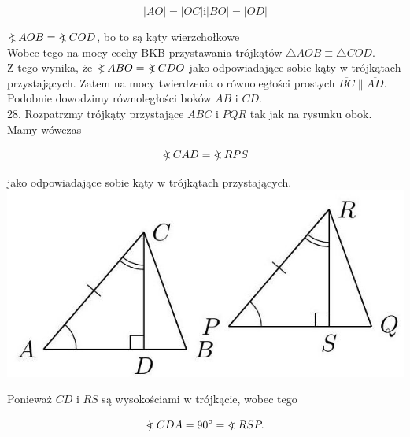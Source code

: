 \documentclass[10pt]{article}
\newcommand\Varangle{\mathop{{<\!\!\!\!\!\text{\small)}}\:}\nolimits}
\begin{document}
\[
|A O|=|O C| \mathrm{i}|B O|=|O D|
\]

\(\Varangle A O B=\Varangle C O D\), bo to są kąty wierzchołkowe\\
Wobec tego na mocy cechy BKB przystawania trójkątów \(\triangle A O B \equiv \triangle C O D\).\\
Z tego wynika, że \(\Varangle A B O=\Varangle C D O\) jako odpowiadające sobie kąty w trójkątach przystających. Zatem na mocy twierdzenia o równoległości prostych \(\overline{B C} \| \overline{A D}\). Podobnie dowodzimy równoległości boków \(A B\) i \(C D\).\\
28. Rozpatrzmy trójkąty przystające \(A B C\) i \(P Q R\) tak jak na rysunku obok. Mamy wówczas

\[
\Varangle C A D=\Varangle R P S
\]

jako odpowiadające sobie kąty w trójkątach przystających.\\
\includegraphics[max width=\textwidth, center]{2024_11_21_71f62bd117d375398909g-067}

Ponieważ \(C D\) i \(R S\) są wysokościami w trójkącie, wobec tego

\[
\Varangle C D A=90^{\circ}=\Varangle R S P .
\]
\end{document}
